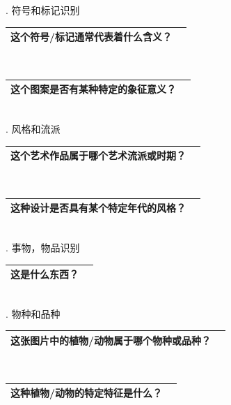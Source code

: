 \documentclass[12pt]{book}
\begin{document}
. 符号和标记识别

\begin{tabular}{|p{15cm}|p{3cm}|}
	\hline
这个符号/标记通常代表着什么含义？\\
	\hline
\end{tabular}\\



\begin{tabular}{|p{15cm}|p{3cm}|}
	\hline
这个图案是否有某种特定的象征意义？\\
	\hline
\end{tabular}\\



. 风格和流派

\begin{tabular}{|p{15cm}|p{3cm}|}
	\hline
这个艺术作品属于哪个艺术流派或时期？\\
	\hline
\end{tabular}\\



\begin{tabular}{|p{15cm}|p{3cm}|}
	\hline
这种设计是否具有某个特定年代的风格？\\
	\hline
\end{tabular}\\



. 事物，物品识别

\begin{tabular}{|p{15cm}|p{3cm}|}
	\hline
这是什么东西？\\
	\hline
\end{tabular}\\



. 物种和品种

\begin{tabular}{|p{15cm}|p{3cm}|}
	\hline
这张图片中的植物/动物属于哪个物种或品种？\\
	\hline
\end{tabular}\\



\begin{tabular}{|p{15cm}|p{3cm}|}
	\hline
这种植物/动物的特定特征是什么？\\
	\hline
\end{tabular}\\
\end{document}
